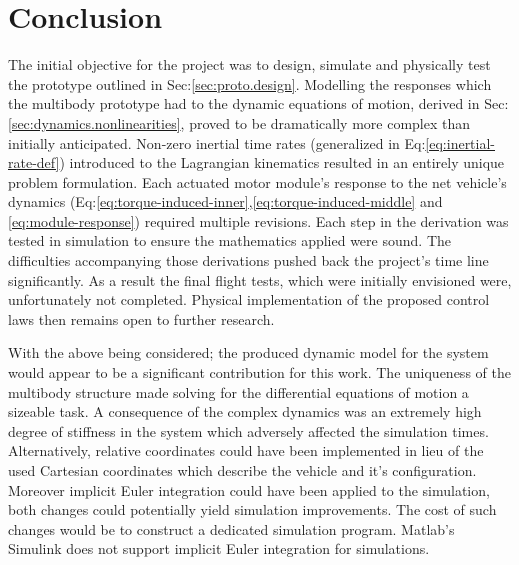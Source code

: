 \chapter{Conclusion}
\label{ch:conclusion}
The initial objective for the project was to design, simulate and physically test the prototype outlined in Sec:\ref{sec:proto.design}. Modelling the responses which the multibody prototype had to the dynamic equations of motion, derived in Sec:\ref{sec:dynamics.nonlinearities}, proved to be dramatically more complex than initially anticipated. 
Non-zero inertial time rates (generalized in Eq:\ref{eq:inertial-rate-def}) introduced to the Lagrangian kinematics resulted in an entirely unique problem formulation. Each actuated motor module's response to the net vehicle's dynamics (Eq:\ref{eq:torque-induced-inner},\ref{eq:torque-induced-middle} and \ref{eq:module-response}) required multiple revisions. Each step in the derivation was tested in simulation to ensure the mathematics applied were sound. The difficulties accompanying those derivations pushed back the project's time line significantly. As a result the final flight tests, which were initially envisioned were, unfortunately not completed. Physical implementation of the proposed control laws then remains open to further research.
\par
With the above being considered; the produced dynamic model for the system would appear to be a significant contribution for this work. The uniqueness of the multibody structure made solving for the differential equations of motion a sizeable task. A consequence of the complex dynamics was an extremely high degree of stiffness in the system which adversely affected the simulation times. Alternatively, relative coordinates could have been implemented in lieu of the used Cartesian coordinates which describe the vehicle and it's configuration. Moreover implicit Euler integration could have been applied to the simulation, both changes could potentially yield simulation improvements. The cost of such changes would be to construct a dedicated simulation program. Matlab's Simulink does not support implicit Euler integration for simulations.
\par
